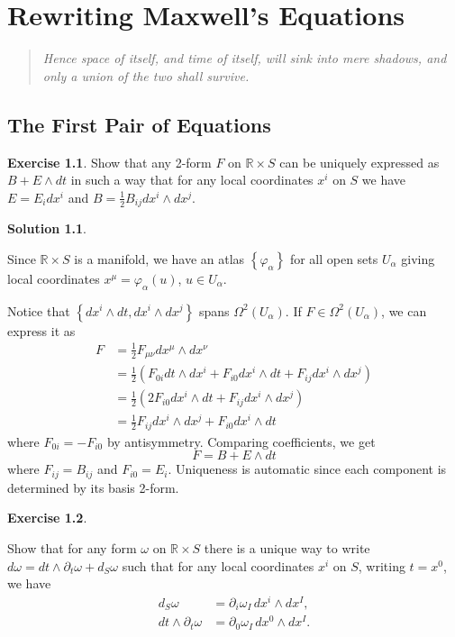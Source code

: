 \documentclass[11pt, a4paper]{report}
\theoremstyle{definition}
\newtheorem{ex}{Exercise}[part]
\newtheorem{sol}{Solution}[part]
\newenvironment{epigraph}
    {\begin{quote}\small\itshape} %
    {\end{quote}\ignorespacesafterend\vspace{\parskip}}
\begin{document}
\chapter{Rewriting Maxwell's Equations}

\begin{epigraph}
    Hence space of itself, and time of itself, will sink into mere shadows, and only a union of the two shall survive.
\end{epigraph}

\section{The First Pair of Equations}

\begin{ex}

Show that any 2-form $F$ on $\mathbb{R} \times S$ can be uniquely expressed as $B + E \wedge dt$ in such a way that for any local coordinates $x^i$ on $S$ we have $E = E_i dx^i$ and $B = \frac{1}{2}B_{ij}dx^i \wedge dx^j$.

\end{ex}

\begin{sol}\label{sol:bplusedt}

Since $\mathbb{R} \times S$ is a manifold, we have an atlas $\left\{\varphi_\alpha\right\}$ for all open sets $U_\alpha$ giving local coordinates $x^\mu = \varphi_\alpha(u)$, $u \in U_\alpha$.

Notice that $\left\{dx^i \wedge dt, dx^i \wedge dx^j\right\}$ spans $\Omega^2(U_\alpha)$.
If $F \in \Omega^2(U_\alpha)$, we can express it as
\begin{align*}
    F &= \frac{1}{2} F_{\mu\nu}dx^\mu \wedge dx^\nu \\
      &= \frac{1}{2} \left( F_{0i} dt \wedge dx^i + F_{i0} dx^i \wedge dt + F_{ij} dx^i \wedge dx^j \right) \\
      &= \frac{1}{2} \left( 2 F_{i0} dx^i \wedge dt + F_{ij} dx^i \wedge dx^j \right) \\
      &= \frac{1}{2} F_{ij} dx^i \wedge dx^j + F_{i0} dx^i \wedge dt
\end{align*}
where $F_{0i} = -F_{i0}$ by antisymmetry. Comparing coefficients, we get
\[
    F = B + E \wedge dt
\]
where $F_{ij} = B_{ij}$ and $F_{i0} = E_i$. Uniqueness is automatic since each component is determined by its basis 2-form.

\end{sol}

\begin{ex}\label{ex:pformspaceandtime}

Show that for any form $\omega$ on $\mathbb{R} \times S$ there is a unique way to write $d\omega = dt \wedge \partial_t \omega + d_S \omega$ such that for any local coordinates $x^i$ on $S$, writing $t = x^0$, we have
\begin{align*}
    d_S\omega &= \partial_i \omega_I \, dx^i \wedge dx^I, \\
    dt \wedge \partial_t \omega &= \partial_0 \omega_I \, dx^0 \wedge dx^I.
\end{align*}

\end{ex}
\end{document}
